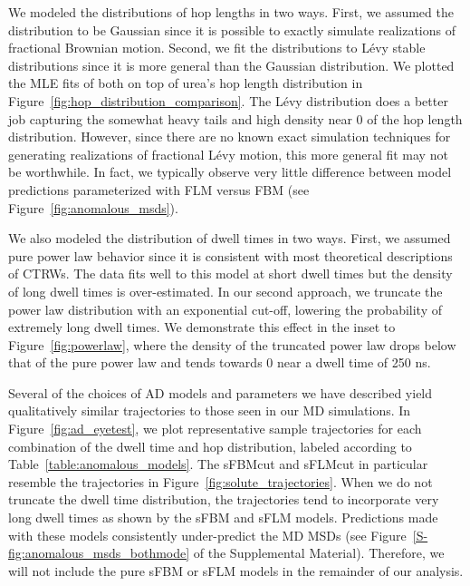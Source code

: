 \documentclass[aps,pre,preprint,groupedaddress,longbibliography]{revtex4-2}
\begin{document}
  We modeled the distributions of hop lengths in two ways. First, we assumed the 
  distribution to be Gaussian since it is possible to exactly simulate realizations of
  fractional Brownian motion. Second, we fit the distributions to L\'evy stable 
  distributions since it is more general than the Gaussian distribution. We plotted
  the MLE fits of both on top of urea's hop length distribution in 
  Figure~\ref{fig:hop_distribution_comparison}. The L\'evy distribution does a 
  better job capturing the somewhat heavy tails and high density near 0 of the hop
  length distribution. However, since there are no known exact simulation techniques
  for generating realizations of fractional L\'evy motion, this more general 
  fit may not be worthwhile. In fact, we typically observe very little difference 
  between model predictions parameterized with FLM versus FBM (see Figure~\ref{fig:anomalous_msds}).
  
  We also modeled the distribution of dwell times in two ways. First, we assumed pure
  power law behavior since it is consistent with most theoretical descriptions of CTRWs.
  The data fits well to this model at short dwell times but the density of long dwell
  times is over-estimated. In our second approach, we truncate the power law distribution
  with an exponential cut-off, lowering the probability of extremely long dwell times. 
  We demonstrate this effect in the inset to Figure~\ref{fig:powerlaw}, where the
  density of the truncated power law drops below that of the pure power law and tends towards
  0 near a dwell time of 250 ns.
  
  Several of the choices of AD models and parameters we have described yield 
  qualitatively similar trajectories to those seen in our MD simulations. 
  In Figure~\ref{fig:ad_eyetest}, we plot representative sample trajectories for each
  combination of the dwell time and hop distribution, labeled according to Table~\ref{table:anomalous_models}.
  The sFBMcut and sFLMcut in particular resemble the trajectories in Figure~\ref{fig:solute_trajectories}.
  When we do not truncate the dwell time distribution, the trajectories tend to 
  incorporate very long dwell times as shown by the sFBM and sFLM models. Predictions
  made with these models consistently under-predict the MD MSDs (see 
  Figure~\ref{S-fig:anomalous_msds_bothmode} of the Supplemental Material). Therefore, 
  we will not include the pure sFBM or sFLM models in the remainder of our analysis.   
  
\end{document}
